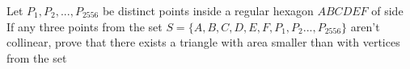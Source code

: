 Let $P_1,P_2,...,P_{2556}$ be distinct points inside a regular hexagon $ABCDEF$ of side  If any three points from the set $S=\{A,B,C,D,E,F,P_1,P_2...,P_{2556}\}$ aren't collinear, prove that there exists a triangle with area smaller than  with vertices from the set 
